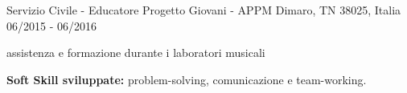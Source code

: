 \begin{cventries}
\cventry
{Servizio Civile - Educatore} %
{Progetto Giovani - APPM} %
{Dimaro, TN 38025, Italia} %
{06/2015 - 06/2016} %
{
  \begin{cvitems} %
    \item assistenza e formazione durante i laboratori musicali
    \item {\textbf{Soft Skill sviluppate:} problem-solving, comunicazione e team-working.}
  \end{cvitems}
}

\end{cventries}
